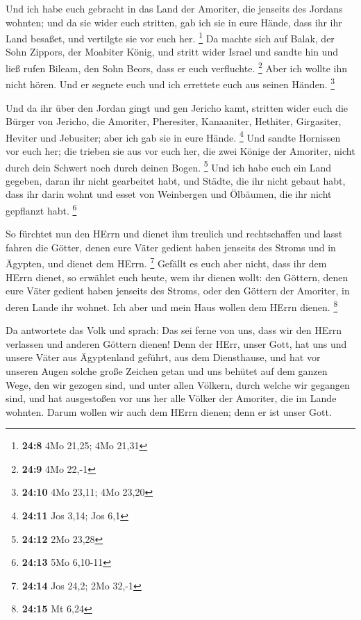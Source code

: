  Und ich habe euch gebracht in das Land der Amoriter, die
jenseits des Jordans wohnten; und da sie wider euch stritten, gab ich
sie in eure Hände, dass ihr ihr Land besaßet, und vertilgte sie vor euch
her. \footnote{\textbf{24:8} 4Mo 21,25; 4Mo 21,31}  Da
machte sich auf Balak, der Sohn Zippors, der Moabiter König, und stritt
wider Israel und sandte hin und ließ rufen Bileam, den Sohn Beors, dass
er euch verfluchte. \footnote{\textbf{24:9} 4Mo 22,-1} 
Aber ich wollte ihn nicht hören. Und er segnete euch und ich errettete
euch aus seinen Händen. \footnote{\textbf{24:10} 4Mo 23,11; 4Mo 23,20}

 Und da ihr über den Jordan gingt und gen Jericho kamt,
stritten wider euch die Bürger von Jericho, die Amoriter, Pheresiter,
Kanaaniter, Hethiter, Girgasiter, Heviter und Jebusiter; aber ich gab
sie in eure Hände. \footnote{\textbf{24:11} Jos 3,14; Jos 6,1}
 Und sandte Hornissen vor euch her; die trieben sie aus vor
euch her, die zwei Könige der Amoriter, nicht durch dein Schwert noch
durch deinen Bogen. \footnote{\textbf{24:12} 2Mo 23,28} 
Und ich habe euch ein Land gegeben, daran ihr nicht gearbeitet habt, und
Städte, die ihr nicht gebaut habt, dass ihr darin wohnt und esset von
Weinbergen und Ölbäumen, die ihr nicht gepflanzt habt. \footnote{\textbf{24:13}
  5Mo 6,10-11}

 So fürchtet nun den HErrn und dienet ihm treulich und
rechtschaffen und lasst fahren die Götter, denen eure Väter gedient
haben jenseits des Stroms und in Ägypten, und dienet dem HErrn.
\footnote{\textbf{24:14} Jos 24,2; 2Mo 32,-1}  Gefällt es
euch aber nicht, dass ihr dem HErrn dienet, so erwählet euch heute, wem
ihr dienen wollt: den Göttern, denen eure Väter gedient haben jenseits
des Stroms, oder den Göttern der Amoriter, in deren Lande ihr wohnet.
Ich aber und mein Haus wollen dem HErrn dienen. \footnote{\textbf{24:15}
  Mt 6,24}

 Da antwortete das Volk und sprach: Das sei ferne von uns,
dass wir den HErrn verlassen und anderen Göttern dienen! 
Denn der HErr, unser Gott, hat uns und unsere Väter aus Ägyptenland
geführt, aus dem Diensthause, und hat vor unseren Augen solche große
Zeichen getan und uns behütet auf dem ganzen Wege, den wir gezogen sind,
und unter allen Völkern, durch welche wir gegangen sind, 
und hat ausgestoßen vor uns her alle Völker der Amoriter, die im Lande
wohnten. Darum wollen wir auch dem HErrn dienen; denn er ist unser Gott.


